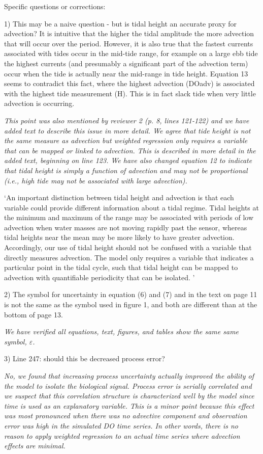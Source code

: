 \documentclass[letterpaper,12pt]{article}\usepackage[]{graphicx}\usepackage[]{color}
\begin{document}
Specific questions or corrections:

1) This may be a naive question -  but is tidal height an accurate proxy for advection? It is intuitive that the higher the tidal amplitude the more advection that will occur over the period. However, it is also true that the fastest currents associated with tides occur in the mid-tide range, for example on a large ebb tide the highest currents (and presumably a significant part of the advection term) occur when the tide is actually near the mid-range in tide height. Equation 13 seems to contradict this fact, where the highest advection (DOadv) is associated with the highest tide measurement (H). This is in fact slack tide when very little advection is occurring.

{\it This point was also mentioned by reviewer 2 (p. 8, lines 121-122) and we have added text to describe this issue in more detail.  We agree that tide height is not the same measure as advection but weighted regression only requires a variable that can be mapped or linked to advection.  This is described in more detail in the added text, beginning on line 123.  We have also changed equation 12 to indicate that tidal height is simply a function of advection and may not be proportional (i.e., high tide may not be associated with large advection).

`An important distinction between tidal height and advection is that each variable could provide different information about a tidal regime.  Tidal heights at the minimum and maximum of the range may be associated with periods of low advection when water masses are not moving rapidly past the sensor, whereas tidal heights near the mean may be more likely to have greater advection.  Accordingly, our use of tidal height should not be confused with a variable that directly measures advection.  The model only requires a variable that indicates a particular point in the tidal cycle, such that tidal height can be mapped to advection with quantifiable periodicity that can be isolated.     
'
}

2) The symbol for uncertainty in equation (6) and (7) and in the text on page 11 is not the same as the symbol used in figure 1, and both are different than at the bottom of page 13.

{\it We have verified all equations, text, figures, and tables show the same same symbol, $\varepsilon$.}

3) Line 247: should this be decreased process error?

{\it No, we found that increasing process uncertainty actually improved the ability of the model to isolate the biological signal.  Process error is serially correlated and we suspect that this correlation structure is characterized well by the model since time is used as an explanatory variable.  This is a minor point because this effect was most pronounced when there was no advective component and observation error was high in the simulated DO time series.  In other words, there is no reason to apply weighted regression to an actual time series where advection effects are minimal.}
\end{document}
